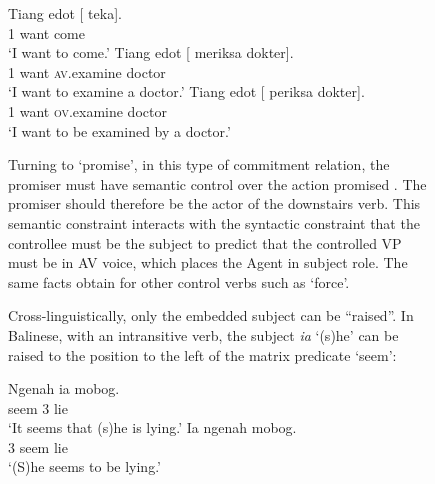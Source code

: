 \documentclass[output=paper
                ,modfonts
                ,nonflat
	        ,collection
	        ,collectionchapter
	        ,collectiontoclongg
 	        ,biblatex
                ,babelshorthands
                ,newtxmath
                ,draftmode
                ,colorlinks, citecolor=brown
]{./langsci/langscibook}
\begin{document}
\begin{figure}
\begin{exe}
\ex \begin{xlist}
\ex 
\gll Tiang edot [ \trace{} teka].\\
     1 want     {} {} come\\\hfill\citep[ex 25]{WechslerandArka1998}
\glt `I want to come.'
\ex 
\gll Tiang edot [ \trace{}  meriksa dokter].\\
     1     want {} {}     \textsc{av}.examine doctor\\
\glt `I want to examine a doctor.'
\ex 
\gll Tiang edot [ \trace{} periksa dokter].\\
     1     want {} {}    \textsc{ov}.examine doctor\\
\glt `I want to be examined by a doctor.'
\end{xlist}
\end{exe}

Turning to  `promise', in this type of commitment relation, the promiser must have semantic control over the action promised \citep{Farkas1988,Kroeger1993,SagandPollard1991}. The promiser should therefore be the actor of the downstairs verb. This semantic constraint interacts with the syntactic constraint that the controllee must be the subject to predict that the controlled VP must be in AV voice, which places the Agent in subject role. The same facts obtain for other control verbs such as  `force'.

\eal
{}
\zl

Cross-linguistically, only the embedded subject can be ``raised''. In Balinese, with an intransitive verb, the subject \emph{ia} `(s)he' can be raised to the position to the left of the matrix predicate  `seem':

\begin{exe}
\ex \begin{xlist}
\ex 
\gll Ngenah ia mobog.\\
     seem 3 lie\\\hfill\citep[ex 7]{WechslerandArka1998}
\glt `It seems that (s)he is lying.'
\ex 
\gll  Ia ngenah mobog.\\
      3 seem lie\\
\glt `(S)he seems to be lying.'
\end{xlist}
\end{exe}


\end{figure}
\end{document}
